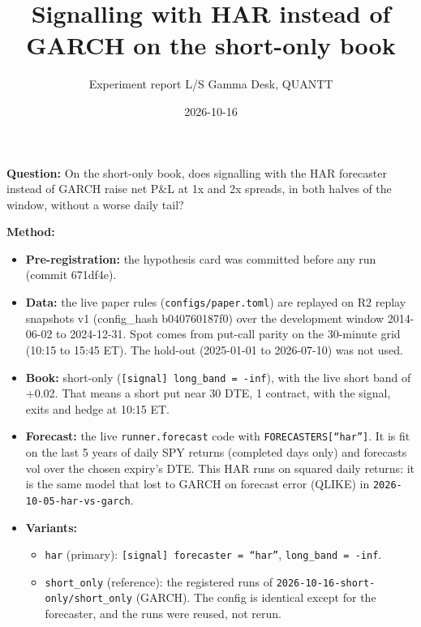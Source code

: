 \documentclass{article}
\title{Signalling with HAR instead of GARCH on the short-only book}
\author{Experiment report \textperiodcentered{} L/S Gamma Desk, QUANTT}
\date{2026-10-16}
\begin{document}
\maketitle

\textbf{Question:} On the short-only book, does signalling with the HAR forecaster instead of GARCH raise net P\&L at 1x and 2x spreads, in both halves of the window, without a worse daily tail?

\textbf{Method:}

\begin{itemize}

\item \textbf{Pre-registration:} the hypothesis card was committed before any run (commit 671df4e).

\item \textbf{Data:} the live paper rules (\texttt{configs/\allowbreak{}paper.\allowbreak{}toml}) are replayed on R2 replay snapshots v1 (config\_hash b040760187f0) over the development window 2014-06-02 to 2024-12-31. Spot comes from put-call parity on the 30-minute grid (10:15 to 15:45 ET). The hold-out (2025-01-01 to 2026-07-10) was not used.

\item \textbf{Book:} short-only (\texttt{[signal] long\_\allowbreak{}band = -\allowbreak{}inf}), with the live short band of +0.02. That means a short put near 30 DTE, 1 contract, with the signal, exits and hedge at 10:15 ET.

\item \textbf{Forecast:} the live \texttt{runner.\allowbreak{}forecast} code with \texttt{FORECASTERS[``har'']}. It is fit on the last 5 years of daily SPY returns (completed days only) and forecasts vol over the chosen expiry's DTE. This HAR runs on squared daily returns: it is the same model that lost to GARCH on forecast error (QLIKE) in \texttt{2026-\allowbreak{}10-\allowbreak{}05-\allowbreak{}har-\allowbreak{}vs-\allowbreak{}garch}.

\item \textbf{Variants:}

\begin{itemize}

\item \texttt{har} (primary): \texttt{[signal] forecaster = ``har''}, \texttt{long\_\allowbreak{}band = -\allowbreak{}inf}.

\item \texttt{short\_\allowbreak{}only} (reference): the registered runs of \texttt{2026-\allowbreak{}10-\allowbreak{}16-\allowbreak{}short-\allowbreak{}only/\allowbreak{}short\_\allowbreak{}only} (GARCH). The config is identical except for the forecaster, and the runs were reused, not rerun.


\end{itemize}
\end{itemize}
\end{document}
